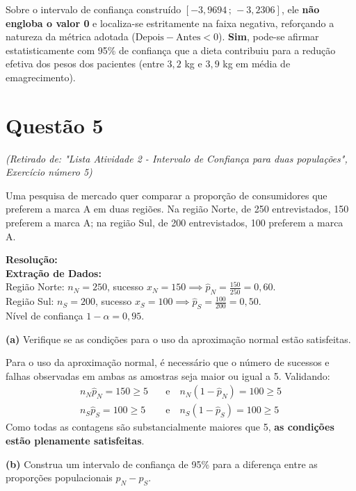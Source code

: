 \documentclass[12pt, a4paper]{article}
\begin{document}
\noindent Sobre o intervalo de confiança construído $[-3,9694 \,;\, -3,2306]$, ele \textbf{não engloba o valor 0} e localiza-se estritamente na faixa negativa, reforçando a natureza da métrica adotada ($\text{Depois} - \text{Antes} < 0$). \textbf{Sim}, pode-se afirmar estatisticamente com 95\% de confiança que a dieta contribuiu para a redução efetiva dos pesos dos pacientes (entre $3,2$ kg e $3,9$ kg em média de emagrecimento).

\section*{Questão 5}
\textit{(Retirado de: "Lista Atividade 2 - Intervalo de Confiança para duas populações", Exercício número 5)}

Uma pesquisa de mercado quer comparar a proporção de consumidores que preferem a marca A em duas regiões. Na região Norte, de 250 entrevistados, 150 preferem a marca A; na região Sul, de 200 entrevistados, 100 preferem a marca A.

\vspace{0.3cm}
\noindent\textbf{Resolução:}\\
\textbf{Extração de Dados:} \\
Região Norte: $n_N = 250$, sucesso $x_N = 150 \implies \hat{p}_N = \frac{150}{250} = 0,60$. \\
Região Sul: $n_S = 200$, sucesso $x_S = 100 \implies \hat{p}_S = \frac{100}{200} = 0,50$. \\
Nível de confiança $1-\alpha = 0,95$.

\medskip\noindent\textbf{(a)} Verifique se as condições para o uso da aproximação normal estão satisfeitas.

\noindent Para o uso da aproximação normal, é necessário que o número de sucessos e falhas observadas em ambas as amostras seja maior ou igual a 5. Validando:
\begin{align*}
n_N\hat{p}_N = 150 \ge 5 & \quad \text{e} \quad n_N(1-\hat{p}_N) = 100 \ge 5 \\
n_S\hat{p}_S = 100 \ge 5 & \quad \text{e} \quad n_S(1-\hat{p}_S) = 100 \ge 5
\end{align*}
Como todas as contagens são substancialmente maiores que 5, \textbf{as condições estão plenamente satisfeitas}.

\medskip\noindent\textbf{(b)} Construa um intervalo de confiança de 95\% para a diferença entre as proporções populacionais $p_N - p_S$.
\end{document}
